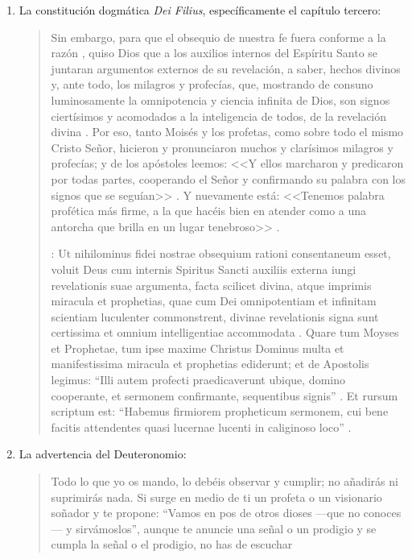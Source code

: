 \begin{enumerate}
\item La constitución dogmática \emph{Dei Filius}, específicamente el capítulo
  tercero: \blockquote[{\cite[\S\,3009]{vati1870df}}: Ut nihilominus fidei
  nostrae obsequium rationi consentaneum  esset,
  voluit Deus cum internis Spiritus Sancti auxiliis externa iungi revelationis
  suae argumenta, facta scilicet divina, atque imprimis miracula et prophetias,
  quae cum Dei omnipotentiam et infinitam scientiam luculenter commonstrent,
  divinae revelationis signa sunt certissima et omnium intelligentiae
  accommodata . Quare tum Moyses et Prophetae, tum
  ipse maxime Christus Dominus multa et manifestissima miracula et prophetias
  ediderunt; et de Apostolis legimus: ``Illi autem profecti praedicaverunt
  ubique, domino cooperante, et sermonem confirmante, sequentibus signis''
  . Et rursum scriptum est: ``Habemus firmiorem
  propheticum sermonem, cui bene facitis attendentes quasi lucernae lucenti in
  caliginoso loco'' .]{Sin embargo, para que el
    obsequio de nuestra fe fuera conforme a la razón , quiso Dios que a los auxilios internos del Espíritu Santo se
    juntaran argumentos externos de su revelación, a saber, hechos divinos y,
    ante todo, los milagros y profecías, que, mostrando de consuno luminosamente
    la omnipotencia y ciencia infinita de Dios, son signos ciertísimos y
    acomodados a la inteligencia de todos, de la revelación divina
    . Por eso, tanto Moisés y los profetas, como
    sobre todo el mismo Cristo Señor, hicieron y pronunciaron muchos y
    clarísimos milagros y profecías; y de los apóstoles leemos: <<Y ellos
    marcharon y predicaron por todas partes, cooperando el Señor y confirmando
    su palabra con los signos que se seguían>> . Y
    nuevamente está: <<Tenemos palabra profética más firme, a la que hacéis bien
    en atender como a una antorcha que brilla en un lugar tenebroso>>
    .}
\item La advertencia del Deuteronomio: \blockquote{Todo lo que yo os mando, lo
    debéis observar y cumplir; no añadirás ni suprimirás nada. Si surge en medio
    de ti un profeta o un visionario soñador y te propone: \enquote{Vamos en pos
      de otros dioses ---que no conoces--- y sirvámoslos}, aunque te anuncie una
    señal o un prodigio y se cumpla la señal o el prodigio, no has de escuchar
}
\end{enumerate}
